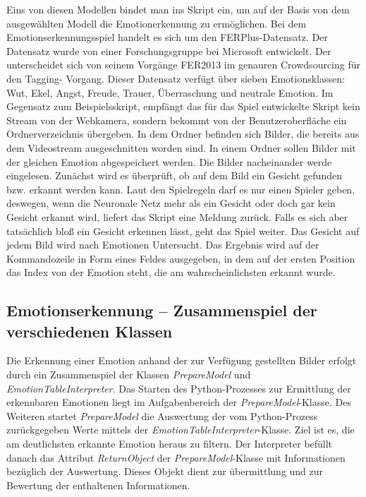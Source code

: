\documentclass[12pt,a4paper,headinclude,twoside, plainheadsepline, open=right,numbers=noenddot]{scrreprt}
\begin{document}
Eins von diesen Modellen bindet man ins Skript ein, um auf der Basis von
dem ausgewählten Modell die Emotionerkennung zu ermöglichen. Bei dem Emotionserkennungsspiel
handelt es sich um den FERPlus-Datensatz. 
 \cite{LeweOhlsen} Der Datensatz wurde
von einer Forschungsgruppe bei Microsoft entwickelt. Der unterscheidet sich
von seinem Vorgänge FER2013 im genauren Crowdsourcing für den Tagging-
Vorgang.
 \cite{RamakrishnanPandeyKarmakarSaha} 
Dieser Datensatz verfügt über sieben Emotionsklassen: Wut, Ekel,
Angst, Freude, Trauer, Überraschung und neutrale Emotion.\newline
Im Gegensatz zum Beispielsskript, empfängt das für das Spiel entwickelte Skript 
kein Stream von der Webkamera, sondern bekommt von der Benutzeroberfläche
ein Ordnerverzeichnis übergeben. In dem Ordner befinden sich Bilder, die bereits
aus dem Videostream ausgeschnitten worden sind. In einem Ordner sollen Bilder
mit der gleichen Emotion abgespeichert werden. Die Bilder nacheinander werde
eingelesen.
 \newline
Zunächst wird es überprüft, ob auf dem Bild ein Gesicht gefunden bzw.
erkannt werden kann. Laut den Spielregeln darf es nur einen Spieler geben,
deswegen, wenn die Neuronale Netz mehr als ein Gesicht oder doch gar kein
Gesicht erkannt wird, liefert das Skript eine Meldung zurück. Falls es sich aber
tatsächlich bloß ein Gesicht erkennen lässt, geht das Spiel weiter. Das Gesicht auf
jedem Bild wird nach Emotionen Untersucht. Das Ergebnis wird auf der Kommandozeile
in Form eines Feldes ausgegeben, in dem auf der ersten Position das
Index von der Emotion steht, die am wahrscheinlichsten erkannt wurde.

\subsection{Emotionserkennung – Zusammenspiel der verschiedenen Klassen}
Die Erkennung einer Emotion anhand der zur Verf\"{u}gung gestellten Bilder erfolgt durch ein Zusammenspiel der Klassen \textit{PrepareModel} und \textit{EmotionTableInterpreter}. Das Starten des Python-Prozesses zur Ermittlung der erkennbaren Emotionen liegt im Aufgabenbereich der \textit{PrepareModel}-Klasse. Des Weiteren startet \textit{PrepareModel} die Auswertung der vom Python-Prozess zur\"{u}ckgegeben Werte mittels der \textit{EmotionTableInterpreter}-Klasse. Ziel ist es, die am deutlichsten erkannte Emotion heraus zu filtern. Der Interpreter bef\"{u}llt danach das Attribut \textit{ReturnObject} der \textit{PrepareModel}-Klasse mit Informationen bez\"{u}glich der Auswertung. Dieses Objekt dient zur \"{u}bermittlung und zur Bewertung der enthaltenen Informationen.
\end{document}

